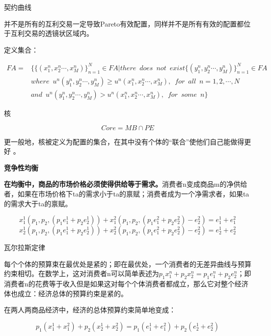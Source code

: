 \documentclass{article}
\begin{document}
\hspace*{\fill}

契约曲线

并不是所有的互利交易一定导致Pareto有效配置，同样并不是所有有效的配置都位于互利交易的透镜状区域内。

定义集合：

\begin{equation*}
\begin{split}
FA=&\{\{(x_1^n,x_2^n\cdots,x_M^n)\}^N_{n=1}\in FA|there\enspace does\enspace not\enspace exist\{(y_1^n,y_2^n\cdots,y_M^n)\}^N_{n=1}\in FA\\
&where\enspace u^n(y_1^n,y_2^n\cdots,y_M^n)\ge u^n(x_1^n,x_2^n\cdots,x_M^n),\enspace for\enspace all\enspace n=1,2,\cdots,N\\
&and\enspace u^n(y_1^n,y_2^n\cdots,y_M^n)> u^n(x_1^n,x_2^n\cdots,x_M^n),\enspace for \enspace some\enspace n\}
\end{split}
\end{equation*}

\hspace*{\fill}

核

\[
Core=MB\cap PE
\]

更一般地，核被定义为配置的集合，在其中没有个体的“联合”使他们自己能做得更好
。

\hspace*{\fill}

\textbf{竞争性均衡}

\textbf{在均衡中，商品的市场价格必须使得供给等于需求。}消费者n变成商品m的净供给者，如果在市场价格下ta的需求小于ta的禀赋；消费者成为一个净需求者，如果ta的需求大于ta的禀赋。

\[
x^1_1(p_1,p_2,(p_1e^1_1+p_2e^1_2))+x^2_1(p_1,p_2,(p_1e^2_1+p_2e^2_2)-e^2_2)=e^1_1+e^2_1
\]
\[
x^1_2(p_1,p_2,(p_1e^1_1+p_2e^1_2))+x^2_2(p_1,p_2,(p_1e^2_1+p_2e^2_2)-e^2_2)=e^1_2+e^2_2
\]

\hspace*{\fill}

瓦尔拉斯定律

每个个体的预算束在最优处是紧的；即在最优处，一个消费者的无差异曲线与预算约束相切。在数学上，这对消费者n可以简单表述为$ p_1x_1^n+p_2x_2^n=p_1e_1^n+p_2e_2^n $；即消费者n的花费等于收入但是如果这对每个个体消费者都成立，那么它对整个经济体也成立：经济总体的预算约束是紧的。

在两人两商品经济中，经济的总体预算约束简单地变成：

\[
p_1(x^1_1+x^2_1)+p_2(x^1_2+x^2_2)=p_1(e^1_1+e^2_1)+p_2(e^1_2+e^2_2)
\]
\end{document}
